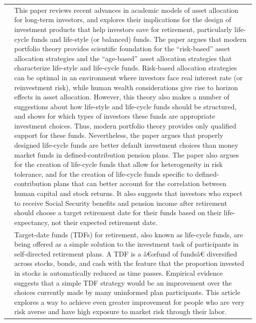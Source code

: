 \documentclass{article}
\begin{document}
\begin{tabular}{p{}p{}}
\cite{Viceira_2007} & This paper reviews recent advances in academic models of asset allocation for long-term investors, and explores their implications for the design of investment products that help investors save for retirement, particularly life-cycle funds and life-style (or balanced) funds. The paper argues that modern portfolio theory provides scientific foundation for the ``risk-based'' asset allocation strategies and the ``age-based'' asset allocation strategies that characterize life-style and life-cycle funds. Risk-based allocation strategies can be optimal in an environment where investors face real interest rate (or reinvestment risk), while human wealth considerations give rise to horizon effects in asset allocation. However, this theory also makes a number of suggestions about how life-style and life-cycle funds should be structured, and shows for which types of investors these funds are appropriate investment choices. Thus, modern portfolio theory provides only qualified support for these funds. Nevertheless, the paper argues that properly designed life-cycle funds are better default investment choices than money market funds in defined-contribution pension plans. The paper also argues for the creation of life-cycle funds that allow for heterogeneity in risk tolerance, and for the creation of life-cycle funds specific to defined-contribution plans that can better account for the correlation between human capital and stock returns. It also suggests that investors who expect to receive Social Security benefits and pension income after retirement should choose a target retirement date for their funds based on their life-expectancy, not their expected retirement date. \\
\cite{Bodie_2007} & Target-date funds (TDFs) for retirement, also known as life-cycle funds, are being offered as a simple solution to the investment task of participants in self-directed retirement plans. A TDF is a â€œfund of fundsâ€ diversified across stocks, bonds, and cash with the feature that the proportion invested in stocks is automatically reduced as time passes. Empirical evidence suggests that a simple TDF strategy would be an improvement over the choices currently made by many uninformed plan participants. This article explores a way to achieve even greater improvement for people who are very risk averse and have high exposure to market risk through their labor. \\

\end{tabular}
\end{document}

